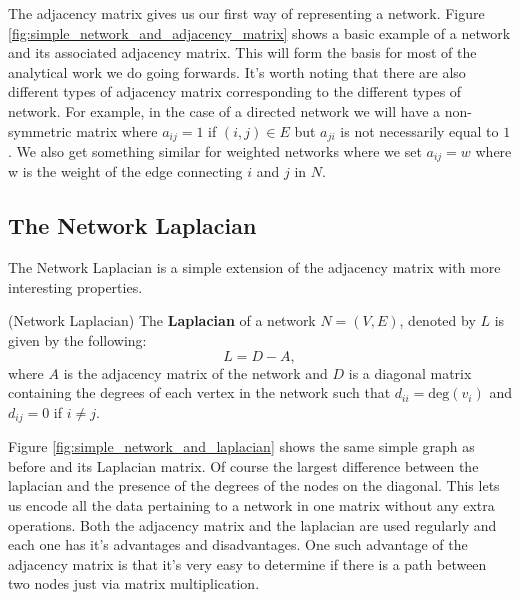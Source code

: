 The adjacency matrix gives us our first way of representing a network. Figure \ref{fig:simple_network_and_adjacency_matrix} shows a basic example of a network and its associated adjacency matrix. This will form the basis for most of the analytical work we do going forwards. It's worth noting that there are also different types of adjacency matrix corresponding to the different types of network. For example, in the case of a directed network we will have a non-symmetric matrix where $a_{ij} = 1$ if $(i, j) \in E$ but $a_{ji}$ is not necessarily equal to $1$. We also get something similar for weighted networks where we set $a_{ij} = w$ where w is the weight of the edge connecting $i$ and $j$ in $N$.

\subsection{The Network Laplacian}
The Network Laplacian is a simple extension of the adjacency matrix with more interesting properties.

\begin{definition}{(Network Laplacian)}
    The \textbf{Laplacian} of a network $N = (V, E)$, denoted by $L$ is given by the following:
    $$ L = D - A, $$
    where $A$ is the adjacency matrix of the network and $D$ is a diagonal matrix containing the degrees of each vertex in the network such that $d_{ii} = \text{deg}(v_i)$ and $d_{ij} = 0$ if $i \not= j$.
\end{definition}

Figure \ref{fig:simple_network_and_laplacian} shows the same simple graph as before and its Laplacian matrix. Of course the largest difference between the laplacian and the presence of the degrees of the nodes on the diagonal. This lets us encode all the data pertaining to a network in one matrix without any extra operations. Both the adjacency matrix and the laplacian are used regularly and each one has it's advantages and disadvantages. One such advantage of the adjacency matrix is that it's very easy to determine if there is a path between two nodes just via matrix multiplication.

